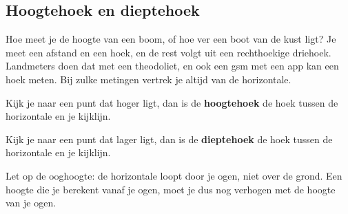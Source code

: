 \subsection{Hoogtehoek en dieptehoek}

Hoe meet je de hoogte van een boom, of hoe ver een boot van de kust ligt? Je meet een afstand en een hoek, en de rest volgt uit een rechthoekige driehoek. Landmeters doen dat met een theodoliet, en ook een gsm met een app kan een hoek meten. Bij zulke metingen vertrek je altijd van de horizontale.

\begin{theorie}
\begin{minipage}[t]{.56\linewidth}
\vspace{0pt}
Kijk je naar een punt dat hoger ligt, dan is de \textbf{\textcolor{accent}{hoogtehoek}} de hoek tussen de horizontale en je kijklijn.

\vspace{1mm}
Kijk je naar een punt dat lager ligt, dan is de \textbf{\textcolor{accent}{dieptehoek}} de hoek tussen de horizontale en je kijklijn.
\end{minipage}\hfill
\begin{minipage}[t]{.4\linewidth}
\vspace{0pt}
\centering
{}
\end{minipage}
\end{theorie}

Let op de ooghoogte: de horizontale loopt door je ogen, niet over de grond. Een hoogte die je berekent vanaf je ogen, moet je dus nog verhogen met de hoogte van je ogen.

